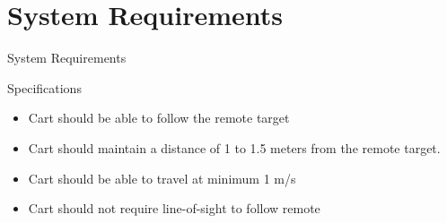 \documentclass{beamer}
\begin{document}




\section{System Requirements}
\begin{frame}{System Requirements}
  \begin{block}{Specifications}
    \begin{itemize}
      \item Cart should be able to follow the remote target
      \item Cart should maintain a distance of 1 to 1.5 meters from the remote target.
      \item Cart should be able to travel at minimum 1 m/s
      \item Cart should not require line-of-sight to follow remote
     \end{itemize}
  \end{block}
\end{frame}
\end{document}
